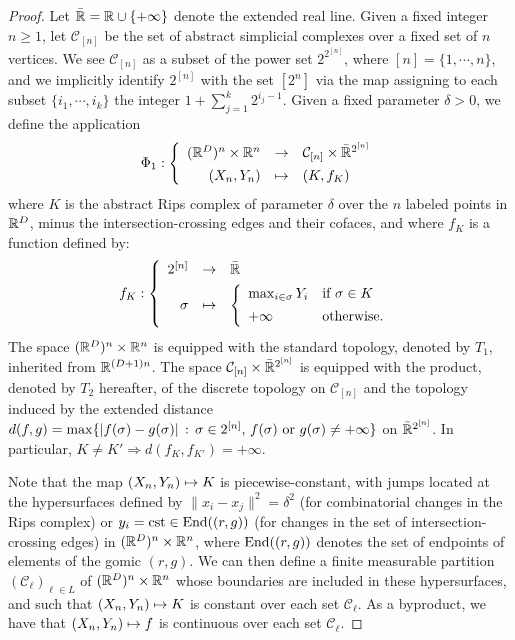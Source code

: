 \begin{proof}
Let $\bar\R=\R\cup\{%
+\infty\}$ denote the extended real line.
Given a fixed integer $n\geq 1$, let $\mathcal{C}_{[n]}$ be the set of abstract simplicial complexes
over a fixed set of $n$ vertices. We see $\mathcal{C}_{[n]}$ as a
subset of the power set $2^{2^{[n]}}$, where $[n] = \{1, \cdots,
n\}$, and we implicitly identify $2^{[n]}$ with the set  $[2^n]$ via the map assigning to each subset 
$\{i_1, \cdots, i_k\}$ the integer $1+\sum_{j=1}^k 2^{i_j-1}$. Given a fixed parameter $\delta>0$, 
we define the application
$$
\Phi_{1}:   
 \left\{
\begin{array}{rcl} 
       (\mathbb{R}^D) ^n \times  \mathbb{R} ^n   &       \rightarrow    &    \mathcal{C}_{[n]} \times     \bar {\mathbb{R}}^{2^{[n]}}     \\[1ex]
 (X_n,Y_n) & \mapsto &	(K,f_K)
 \end{array} \right.
$$ where $K$ is the abstract Rips complex of parameter $\delta$ over
the $n$ labeled points in $\mathbb{R}^D$, minus the intersection-crossing edges and their cofaces, 
and where $f_K$ is a function
defined %
by:
%
\[
f_K :
\left\{
\begin{array}{rcl} 
       2^{[n]}   &       \rightarrow &     \bar{\mathbb{R}}  \\[1ex]
\sigma  &  \mapsto &
 \left\{
\begin{array}{ll} 
 \max_{i \in \sigma}  Y_i  & \textrm{if $\sigma \in K$} \\[1ex]
 +\infty & \textrm{otherwise.}
 \end{array}
  \right.
  \end{array} 
\right.
\]
%
The space $(\mathbb{R}^D) ^n \times \mathbb{R} ^n$ is
equipped with the standard topology, denoted by $T_1$, inherited from $\mathbb{R}^{(D+1)n}$.
The space $\mathcal{C}_{[n]} \times \bar {\mathbb{R}}^{2^{[n]}}$ is
equipped with the product, denoted by $T_2$ hereafter, of the discrete topology on
$\mathcal{C}_{[n]}$ and the topology induced by the extended distance
$d(f,g)=\max\{|f(\sigma)-g(\sigma)|\,:\,\sigma\in 2^{[n]},\,f(\sigma){\rm\ or\ }g(\sigma)\neq +\infty\}$ on $\bar {\mathbb{R}}^{2^{[n]}}$. 
In particular, $K\neq K'\Rightarrow d(f_K,f_{K'})=+\infty$. 

Note that the map $ (X_n, Y_n)   \mapsto K$ is piecewise-constant, 
with jumps located at the hypersurfaces defined by $\| x_i - x_j \|^2 = \delta^2$  
(for combinatorial changes in the Rips complex) or 
$y_i=\mathrm{cst} \in \mathrm{End}((r,g))$ 
(for changes in the set of intersection-crossing edges) in 
$(\mathbb{R}^D) ^n \times \mathbb{R}^n$, where $\mathrm{End}((r,g))$ denotes the set of endpoints of elements of the gomic $(r,g)$. We can then define a finite measurable partition 
$(\mathcal C_\ell)_{\ell \in L} $ of $(\mathbb{R}^D) ^n\times \mathbb{R}^n$ whose boundaries are included in   
these hypersurfaces, and such that $(X_n, Y_n)   \mapsto K$ is constant over each set $\mathcal C_\ell$.  
As a byproduct, we have that $(X_n, Y_n)\mapsto f$ is  continuous over each set $\mathcal C_\ell$. 


\end{proof}
